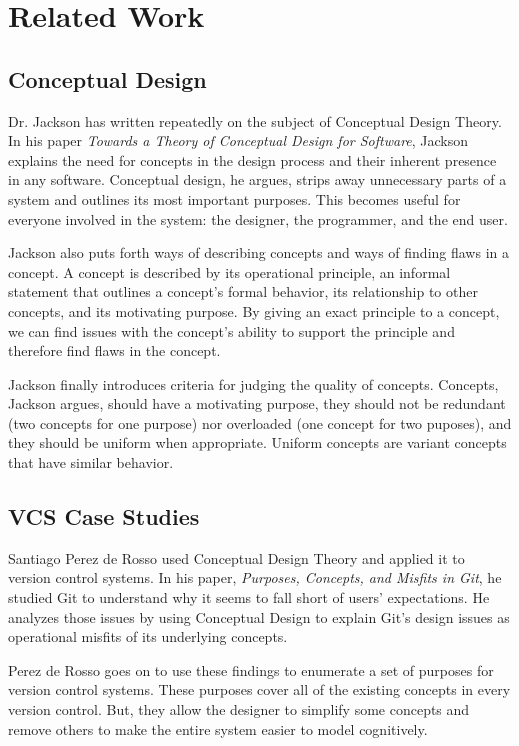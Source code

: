 \chapter{Related Work}

\section{Conceptual Design}

Dr. Jackson has written repeatedly on the subject of Conceptual Design Theory. In his paper \textit{Towards a Theory of Conceptual Design for Software}, Jackson explains the need for concepts in the design process and their inherent presence in any software. Conceptual design, he argues, strips away unnecessary parts of a system and outlines its most important purposes. This becomes useful for everyone involved in the system: the designer, the programmer, and the end user.

Jackson also puts forth ways of describing concepts and ways of finding flaws in a concept. A concept is described by its operational principle, an informal statement that outlines a concept's formal behavior, its relationship to other concepts, and its motivating purpose. By giving an exact principle to a concept, we can find issues with the concept's ability to support the principle and therefore find flaws in the concept.

Jackson finally introduces criteria for judging the quality of concepts. Concepts, Jackson argues, should have a motivating purpose, they should not be redundant (two concepts for one purpose) nor overloaded (one concept for two puposes), and they should be uniform when appropriate. Uniform concepts are variant concepts that have similar behavior.

\section{VCS Case Studies}

Santiago Perez de Rosso used Conceptual Design Theory and applied it to version control systems. In his paper, \textit{Purposes, Concepts, and Misfits in Git}, he studied Git to understand why it seems to fall short of users' expectations. He analyzes those issues by using Conceptual Design to explain Git's design issues as operational misfits of its underlying concepts.

Perez de Rosso goes on to use these findings to enumerate a set of purposes for version control systems. These purposes cover all of the existing concepts in every version control. But, they allow the designer to simplify some concepts and remove others to make the entire system easier to model cognitively. 


